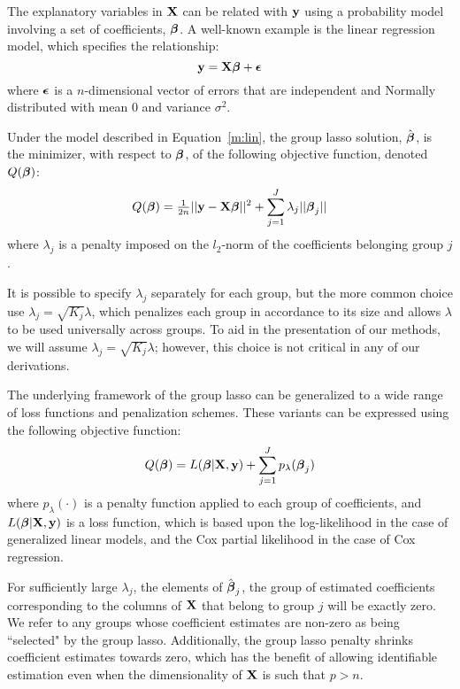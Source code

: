 The explanatory variables in $\mathbf{X}$ can be related with $\mathbf{y}$ using a probability model involving a set of coefficients, $\boldsymbol{\beta}$. A well-known example is the linear regression model, which specifies the relationship:
\begin{equation}
\label{m:lin}
\mathbf{y} = \mathbf{X}\boldsymbol{\beta} + \boldsymbol{\epsilon}
\end{equation}
where $\boldsymbol{\epsilon}$ is a $n$-dimensional vector of errors that are independent and Normally distributed with mean 0 and variance $\sigma^2$. 

Under the model described in Equation~\ref{m:lin}, the group lasso solution, $\hat{\boldsymbol{\beta}}$, is the minimizer, with respect to $\boldsymbol{\beta}$, of the following objective function, denoted $Q(\boldsymbol{\beta})$:
\begin{equation}
Q(\boldsymbol{\beta}) = \tfrac{1}{2n}||\mathbf{y} - \mathbf{X}\boldsymbol{\beta}||^2 + \sum_{j = 1}^{J}\lambda_j ||\boldsymbol{\beta}_j||
\end{equation}
where $\lambda_j$ is a penalty imposed on the $l_2$-norm of the coefficients belonging group $j$. 

It is possible to specify $\lambda_j$ separately for each group, but the more common choice use $\lambda_j = \sqrt{K_j}\lambda$, which penalizes each group in accordance to its size and allows $\lambda$ to be used universally across groups. To aid in the presentation of our methods, we will assume $\lambda_j = \sqrt{K_j}\lambda$; however, this choice is not critical in any of our derivations.

The underlying framework of the group lasso can be generalized to a wide range of loss functions and penalization schemes. These variants can be expressed using the following objective function:
\begin{equation}
Q(\boldsymbol{\beta}) = L(\boldsymbol{\beta}|\mathbf{X},\mathbf{y}) + \sum_{j = 1}^{J} p_{\lambda}(\boldsymbol{\beta}_j)
\end{equation}
where $p_{\lambda}(\cdot)$ is a penalty function applied to each group of coefficients, and $L(\boldsymbol{\beta}|\mathbf{X},\mathbf{y})$ is a loss function, which is based upon the log-likelihood in the case of generalized linear models, and the Cox partial likelihood in the case of Cox regression.

For sufficiently large $\lambda_j$, the elements of $\hat{\boldsymbol{\beta}}_j$, the group of estimated coefficients corresponding to the columns of $\mathbf{X}$ that belong to group $j$ will be exactly zero. We refer to any groups whose coefficient estimates are non-zero as being ``selected" by the group lasso. Additionally, the group lasso penalty shrinks coefficient estimates towards zero, which has the benefit of allowing identifiable estimation even when the dimensionality of $\mathbf{X}$ is such that $p > n$.

